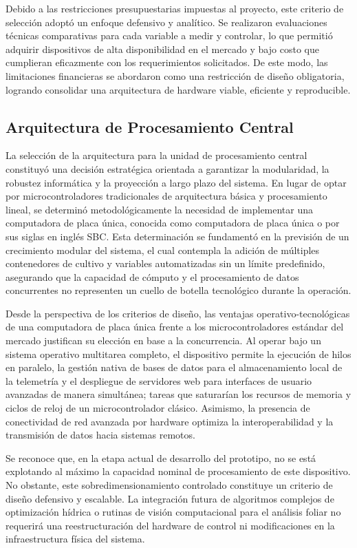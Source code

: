 Debido a las restricciones presupuestarias impuestas al proyecto, este criterio de selección adoptó un enfoque defensivo y analítico. Se realizaron evaluaciones técnicas comparativas para cada variable a medir y controlar, lo que permitió adquirir dispositivos de alta disponibilidad en el mercado y bajo costo que cumplieran eficazmente con los requerimientos solicitados. De este modo, las limitaciones financieras se abordaron como una restricción de diseño obligatoria, logrando consolidar una arquitectura de hardware viable, eficiente y reproducible.

\subsection{Arquitectura de Procesamiento Central}
La selección de la arquitectura para la unidad de procesamiento central constituyó una decisión estratégica orientada a garantizar la modularidad, la robustez informática y la proyección a largo plazo del sistema. En lugar de optar por microcontroladores tradicionales de arquitectura básica y procesamiento lineal, se determinó metodológicamente la necesidad de implementar una computadora de placa única, conocida como computadora de placa única o por sus siglas en inglés SBC. Esta determinación se fundamentó en la previsión de un crecimiento modular del sistema, el cual contempla la adición de múltiples contenedores de cultivo y variables automatizadas sin un límite predefinido, asegurando que la capacidad de cómputo y el procesamiento de datos concurrentes no representen un cuello de botella tecnológico durante la operación.

Desde la perspectiva de los criterios de diseño, las ventajas operativo-tecnológicas de una computadora de placa única frente a los microcontroladores estándar del mercado justifican su elección en base a la concurrencia. Al operar bajo un sistema operativo multitarea completo, el dispositivo permite la ejecución de hilos en paralelo, la gestión nativa de bases de datos para el almacenamiento local de la telemetría y el despliegue de servidores web para interfaces de usuario avanzadas de manera simultánea; tareas que saturarían los recursos de memoria y ciclos de reloj de un microcontrolador clásico. Asimismo, la presencia de conectividad de red avanzada por hardware optimiza la interoperabilidad y la transmisión de datos hacia sistemas remotos.

Se reconoce que, en la etapa actual de desarrollo del prototipo, no se está explotando al máximo la capacidad nominal de procesamiento de este dispositivo. No obstante, este sobredimensionamiento controlado constituye un criterio de diseño defensivo y escalable. La integración futura de algoritmos complejos de optimización hídrica o rutinas de visión computacional para el análisis foliar no requerirá una reestructuración del hardware de control ni modificaciones en la infraestructura física del sistema.

